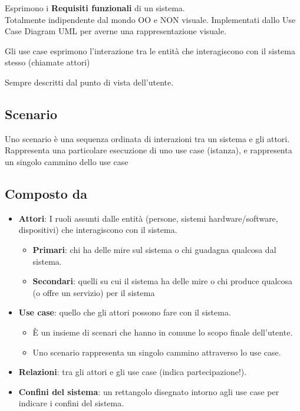 Esprimono i \textbf{Requisiti funzionali} di un sistema.\\
Totalmente indipendente dal mondo OO e NON visuale. Implementati dallo Use Case Diagram UML per averne una rappresentazione visuale.

\noindent Gli use case esprimono l’interazione tra le entità che interagiscono con il sistema stesso (chiamate attori)

\noindent Sempre descritti dal punto di vista dell'utente.

\subsection{Scenario}
Uno scenario è una sequenza ordinata di interazioni tra un sistema e gli attori.\\
Rappresenta una particolare esecuzione di uno use case (istanza), e rappresenta un singolo cammino dello use case

\subsection{Composto da}
\begin{itemize}
    \item \textbf{Attori}: I ruoli assunti dalle entità (persone, sistemi hardware/software, dispositivi) che interagiscono con il sistema.
    \begin{itemize}
        \item \textbf{Primari}: chi ha delle mire sul sistema o chi guadagna qualcosa dal sistema.
        \item \textbf{Secondari}: quelli su cui il sistema ha delle mire o chi produce qualcosa (o offre un servizio) per il sistema
    \end{itemize}
    
    \item \textbf{Use case}: quello che gli attori possono fare con il sistema.
    \begin{itemize}
        \item È un insieme di scenari che hanno in comune lo scopo finale dell'utente.
        \item Uno scenario rappresenta un singolo cammino attraverso lo use case.
    \end{itemize}
    
    \item \textbf{Relazioni}: tra gli attori e gli use case (indica partecipazione!).
    \item \textbf{Confini del sistema}: un rettangolo disegnato intorno agli use case per indicare i confini del sistema.
\end{itemize}

